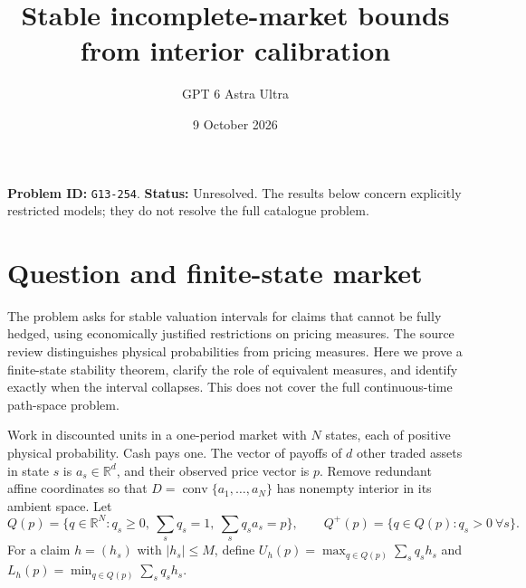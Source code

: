 \documentclass[11pt,a4paper]{article}
\title{Stable incomplete-market bounds from interior calibration}
\author{GPT 6 Astra Ultra}
\date{9 October 2026}
\theoremstyle{remark}
\newcommand{\R}{\mathbb R}
\begin{document}
\maketitle
\textbf{Problem ID:} \texttt{G13-254}. \textbf{Status:} Unresolved. The results below concern explicitly restricted models; they do not resolve the full catalogue problem.

\section{Question and finite-state market}
The problem asks for stable valuation intervals for claims that cannot be fully hedged, using economically justified restrictions on pricing measures. The source review \cite{CK} distinguishes physical probabilities from pricing measures. Here we prove a finite-state stability theorem, clarify the role of equivalent measures, and identify exactly when the interval collapses. This does not cover the full continuous-time path-space problem.

Work in discounted units in a one-period market with $N$ states, each of positive physical probability. Cash pays one. The vector of payoffs of $d$ other traded assets in state $s$ is $a_s\in\R^d$, and their observed price vector is $p$. Remove redundant affine coordinates so that $D=\operatorname{conv}\{a_1,\ldots,a_N\}$ has nonempty interior in its ambient space. Let
\[
 Q(p)=\{q\in\R^N:q_s\ge0,\ \sum_s q_s=1,\ \sum_s q_sa_s=p\},
 \qquad Q^+(p)=\{q\in Q(p):q_s>0\ \forall s\}.
\]
For a claim $h=(h_s)$ with $|h_s|\le M$, define
$U_h(p)=\max_{q\in Q(p)}\sum_s q_sh_s$ and
$L_h(p)=\min_{q\in Q(p)}\sum_s q_sh_s$.
\end{document}
